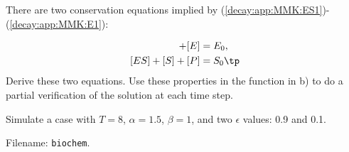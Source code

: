 \documentclass[graybox,sectrefs,envcountresetchap,open=right,final]{svmonodo}
\newenvironment{doconceexercise}{}{}
\begin{document}
\begin{doconceexercise}
There are two conservation equations implied by
(\ref{decay:app:MMK:ES1})-(\ref{decay:app:MMK:E1}):

\begin{align}
[ES] + [E] &= E_0,\\ 
[ES] + [S] + [P] &= S_0\tp
\end{align}
Derive these two equations. Use these properties in the function
in b) to do a partial verification of the solution at each time step.



Simulate a case with $T=8$, $\alpha = 1.5$, $\beta=1$, and two
$\epsilon$ values: 0.9 and 0.1.



\noindent Filename: \texttt{biochem}.

\end{doconceexercise}
\end{document}
